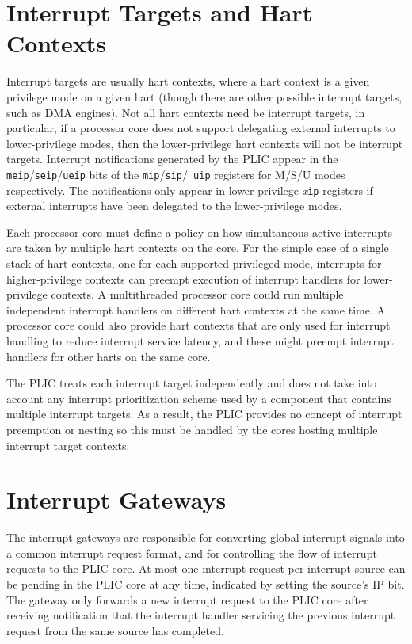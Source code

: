 \section{Interrupt Targets and Hart Contexts}

Interrupt targets are usually hart contexts, where a hart context is a
given privilege mode on a given hart (though there are other possible
interrupt targets, such as DMA engines).  Not all hart contexts need
be interrupt targets, in particular, if a processor core does not
support delegating external interrupts to lower-privilege modes, then
the lower-privilege hart contexts will not be interrupt targets.
Interrupt notifications generated by the PLIC appear in the {\tt
  meip}/{\tt seip}/{\tt ueip} bits of the {\tt mip}/{\tt sip}/{\tt
  uip} registers for M/S/U modes respectively.  The notifications
only appear in lower-privilege {\em x}{\tt ip} registers if external
interrupts have been delegated to the lower-privilege modes.

Each processor core must define a policy on how simultaneous active
interrupts are taken by multiple hart contexts on the core. For the
simple case of a single stack of hart contexts, one for each supported
privileged mode, interrupts for higher-privilege contexts can preempt
execution of interrupt handlers for lower-privilege contexts.  A
multithreaded processor core could run multiple independent interrupt
handlers on different hart contexts at the same time.  A processor
core could also provide hart contexts that are only used for interrupt
handling to reduce interrupt service latency, and these might preempt
interrupt handlers for other harts on the same core.

The PLIC treats each interrupt target independently and does not take
into account any interrupt prioritization scheme used by a component
that contains multiple interrupt targets.  As a result, the PLIC
provides no concept of interrupt preemption or nesting so this must be
handled by the cores hosting multiple interrupt target contexts.

\section{Interrupt Gateways}

The interrupt gateways are responsible for converting global interrupt
signals into a common interrupt request format, and for controlling
the flow of interrupt requests to the PLIC core.  At most one
interrupt request per interrupt source can be pending in the PLIC core
at any time, indicated by setting the source's IP bit.  The gateway
only forwards a new interrupt request to the PLIC core after receiving
notification that the interrupt handler servicing the previous
interrupt request from the same source has completed.

